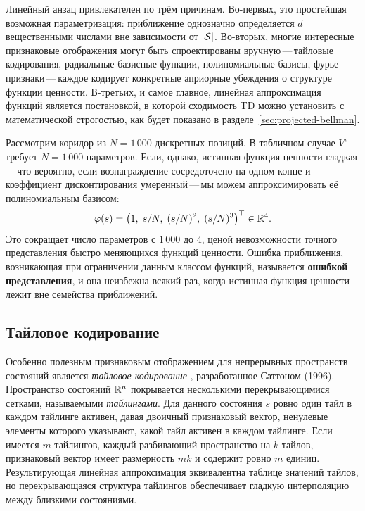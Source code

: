 Линейный анзац привлекателен по трём причинам.  Во-первых, это простейшая возможная параметризация: приближение однозначно определяется $d$ вещественными числами вне зависимости от $|\mathcal{S}|$.  Во-вторых, многие интересные признаковые отображения могут быть спроектированы вручную\,---\,тайловые кодирования, радиальные базисные функции, полиномиальные базисы, фурье-признаки\,---\,каждое кодирует конкретные априорные убеждения о структуре функции ценности.  В-третьих, и самое главное, линейная аппроксимация функций является постановкой, в которой сходимость TD можно установить с математической строгостью, как будет показано в разделе~\ref{sec:projected-bellman}.

\begin{example}
\label{ex:poly-features}
Рассмотрим коридор из $N = 1\,000$ дискретных позиций.  В табличном случае $V^\pi$ требует $N = 1\,000$ параметров.  Если, однако, истинная функция ценности гладкая\,---\,что вероятно, если вознаграждение сосредоточено на одном конце и коэффициент дисконтирования умеренный\,---\,мы можем аппроксимировать её полиномиальным базисом:
\[
\varphi(s) = \bigl(1,\; s/N,\; (s/N)^2,\; (s/N)^3\bigr)^\top \in \mathbb{R}^4.
\]
Это сокращает число параметров с $1\,000$ до $4$, ценой невозможности точного представления быстро меняющихся функций ценности.  Ошибка приближения, возникающая при ограничении данным классом функций, называется \textbf{ошибкой представления}, и она неизбежна всякий раз, когда истинная функция ценности лежит вне семейства приближений.
\end{example}

\subsection{Тайловое кодирование}

Особенно полезным признаковым отображением для непрерывных пространств состояний является \emph{тайловое кодирование}%
, разработанное Саттоном (1996).  Пространство состояний $\mathbb{R}^n$ покрывается несколькими перекрывающимися сетками, называемыми \emph{тайлингами}.  Для данного состояния $s$ ровно один тайл в каждом тайлинге активен, давая двоичный признаковый вектор, ненулевые элементы которого указывают, какой тайл активен в каждом тайлинге.  Если имеется $m$ тайлингов, каждый разбивающий пространство на $k$ тайлов, признаковый вектор имеет размерность $mk$ и содержит ровно $m$ единиц.  Результирующая линейная аппроксимация эквивалентна таблице значений тайлов, но перекрывающаяся структура тайлингов обеспечивает гладкую интерполяцию между близкими состояниями.

